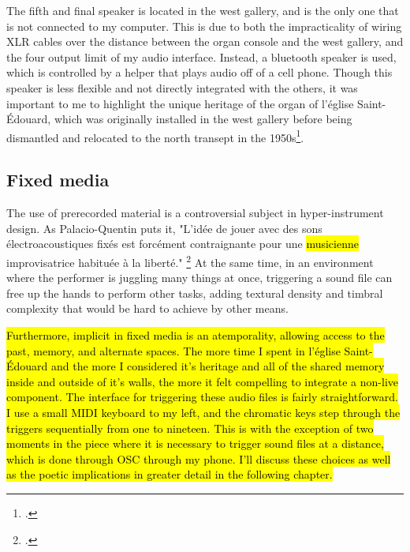 \documentclass[12pt,twoside,maitrise]{dms_ks}
\theoremstyle{definition}
\begin{document}
{{The fifth and final speaker is located in the west gallery, and is the only one that is not connected to my computer.
This is due to both the impracticality of wiring XLR cables over the distance between the organ console and the west gallery, and the four output limit of my audio interface.
Instead, a bluetooth speaker is used, which is controlled by a helper that plays audio off of a cell phone.
Though this speaker is less flexible and not directly integrated with the others, it was important to me to highlight the unique heritage of the organ of l'église Saint-Édouard, which was originally installed in the west gallery before being dismantled and relocated to the north transept in the 1950s}\footcite{noauthor_eglise_nodate}. 



\subsection{Fixed media}

The use of prerecorded material is a controversial subject in hyper-instrument design.
As Palacio-Quentin puts it, "L’idée de jouer avec des sons électroacoustiques fixés est forcément contraignante pour une \hl{musicienne} improvisatrice habituée à la liberté." \footcite[50]{palacio-quintin_composition_2012-1}
At the same time, in an environment where the performer is juggling many things at once, triggering a sound file can free up the hands to perform other tasks, adding textural density and timbral complexity that would be hard to achieve by other means. 


\hl{Furthermore, implicit in fixed media is an atemporality, allowing access to the past, memory, and alternate spaces.
The more time I spent in l'église Saint-Édouard and the more I considered it's heritage and all of the shared memory inside and outside of it's walls, the more it felt compelling to integrate a non-live component.
The interface for triggering these audio files is fairly straightforward.
I use a small MIDI keyboard to my left, and the chromatic keys step through the triggers sequentially from one to nineteen. 
This is with the exception of two moments in the piece where it is necessary to trigger sound files at a distance, which is done through OSC through my phone.
I'll discuss these choices as well as the poetic implications in greater detail in the following chapter.}

}
\end{document}
